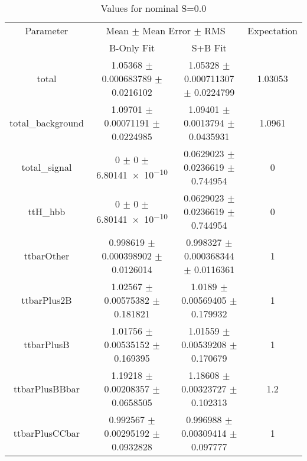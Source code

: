 \begin{table}
\centering
\caption{Values for nominal S=0.0}
\begin{tabular}{cccc}
\toprule
Parameter & \multicolumn{2}{c}{Mean $\pm$ Mean Error $\pm$ RMS} & Expectation\\
 & B-Only Fit & S+B Fit & \\
\midrule
total & \num{1.05368} $\pm$ \num{0.000683789} $\pm$ \num{0.0216102} & \num{1.05328} $\pm$ \num{0.000711307} $\pm$ \num{0.0224799} & \num{1.03053}\\
total\_background & \num{1.09701} $\pm$ \num{0.00071191} $\pm$ \num{0.0224985} & \num{1.09401} $\pm$ \num{0.0013794} $\pm$ \num{0.0435931} & \num{1.0961}\\
total\_signal & \num{0} $\pm$ \num{0} $\pm$ \num{6.80141e-10} & \num{0.0629023} $\pm$ \num{0.0236619} $\pm$ \num{0.744954} & \num{0}\\
ttH\_hbb & \num{0} $\pm$ \num{0} $\pm$ \num{6.80141e-10} & \num{0.0629023} $\pm$ \num{0.0236619} $\pm$ \num{0.744954} & \num{0}\\
ttbarOther & \num{0.998619} $\pm$ \num{0.000398902} $\pm$ \num{0.0126014} & \num{0.998327} $\pm$ \num{0.000368344} $\pm$ \num{0.0116361} & \num{1}\\
ttbarPlus2B & \num{1.02567} $\pm$ \num{0.00575382} $\pm$ \num{0.181821} & \num{1.0189} $\pm$ \num{0.00569405} $\pm$ \num{0.179932} & \num{1}\\
ttbarPlusB & \num{1.01756} $\pm$ \num{0.00535152} $\pm$ \num{0.169395} & \num{1.01559} $\pm$ \num{0.00539208} $\pm$ \num{0.170679} & \num{1}\\
ttbarPlusBBbar & \num{1.19218} $\pm$ \num{0.00208357} $\pm$ \num{0.0658505} & \num{1.18608} $\pm$ \num{0.00323727} $\pm$ \num{0.102313} & \num{1.2}\\
ttbarPlusCCbar & \num{0.992567} $\pm$ \num{0.00295192} $\pm$ \num{0.0932828} & \num{0.996988} $\pm$ \num{0.00309414} $\pm$ \num{0.097777} & \num{1}\\
\bottomrule
\end{tabular}
\end{table}